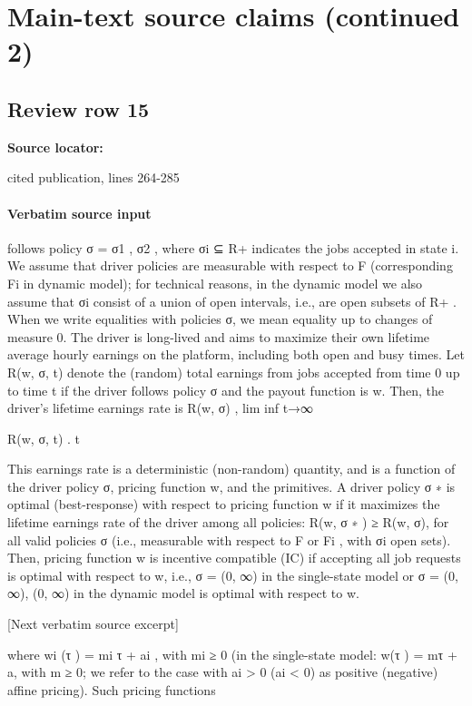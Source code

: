 \documentclass[10pt]{article}
\begin{document}
\section*{Main-text source claims (continued 2)}
\subsection*{Review row 15}
\textbf{Source locator:} {\footnotesize\raggedright cited publication, lines 264-\allowbreak{}285\par}
\paragraph{Verbatim source input}
\begin{ReviewVerbatim}
follows policy σ = {σ1 , σ2 }, where σi ⊆ R+ indicates the jobs accepted in state i. We assume that
driver policies are measurable with respect to F (corresponding Fi in dynamic model); for technical
reasons, in the dynamic model we also assume that σi consist of a union of open intervals, i.e., are
open subsets of R+ . When we write equalities with policies σ, we mean equality up to changes of
measure 0.
The driver is long-lived and aims to maximize their own lifetime average hourly earnings on the
platform, including both open and busy times. Let R(w, σ, t) denote the (random) total earnings
from jobs accepted from time 0 up to time t if the driver follows policy σ and the payout function
is w. Then, the driver’s lifetime earnings rate is
R(w, σ) , lim inf t→∞

R(w, σ, t)
.
t

This earnings rate is a deterministic (non-random) quantity, and is a function of the driver policy
σ, pricing function w, and the primitives.
A driver policy σ ∗ is optimal (best-response) with respect to pricing function w if it maximizes
the lifetime earnings rate of the driver among all policies: R(w, σ ∗ ) ≥ R(w, σ), for all valid policies
σ (i.e., measurable with respect to F or Fi , with σi open sets). Then, pricing function w is incentive
compatible (IC) if accepting all job requests is optimal with respect to w, i.e., σ = (0, ∞) in
the single-state model or σ = {(0, ∞), (0, ∞)} in the dynamic model is optimal with respect to w.

[Next verbatim source excerpt]

where wi (τ ) = mi τ + ai , with mi ≥ 0 (in the single-state model: w(τ ) = mτ + a, with m ≥ 0; we
refer to the case with ai > 0 (ai < 0) as positive (negative) affine pricing). Such pricing functions


\end{ReviewVerbatim}
\end{document}
